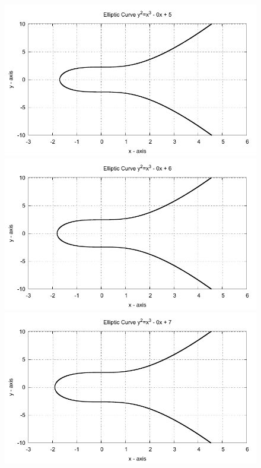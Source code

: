 \begin{figure}[!htbp]

  \begin{minipage}{0.3\textwidth} \centering
    \includegraphics{../Images/ecc_plot/7}
  \end{minipage}
  \begin{minipage}{0.3\textwidth} \centering
    \includegraphics{../Images/ecc_plot/8}
  \end{minipage}
  \begin{minipage}{0.3\textwidth} \centering
    \includegraphics{../Images/ecc_plot/9}
  \end{minipage}
\end{figure}

